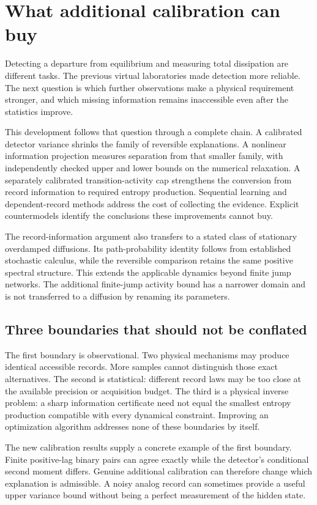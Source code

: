 \chapter{What additional calibration can buy}
\label{ci:entry}

Detecting a departure from equilibrium and measuring total dissipation are
different tasks. The previous virtual laboratories made detection more
reliable. The next question is which further observations make a physical
requirement stronger, and which missing information remains inaccessible even
after the statistics improve.

This development follows that question through a complete chain. A calibrated
detector variance shrinks the family of reversible explanations. A nonlinear
information projection measures separation from that smaller family, with
independently checked upper and lower bounds on the numerical relaxation.
A separately calibrated transition-activity cap strengthens the conversion
from record information to required entropy production. Sequential learning
and dependent-record methods address the cost of collecting the evidence.
Explicit countermodels identify the conclusions these improvements cannot buy.

The record-information argument also transfers to a stated class of stationary
overdamped diffusions. Its path-probability identity follows from established
stochastic calculus, while the reversible comparison retains the same positive
spectral structure. This extends the applicable dynamics beyond finite jump
networks. The additional finite-jump activity bound has a narrower domain and
is not transferred to a diffusion by renaming its parameters.

\section{Three boundaries that should not be conflated}
The first boundary is observational. Two physical mechanisms may produce
identical accessible records. More samples cannot distinguish those exact
alternatives. The second is statistical: different record laws may be too
close at the available precision or acquisition budget. The third is a
physical inverse problem: a sharp information certificate need not equal the
smallest entropy production compatible with every dynamical constraint.
Improving an optimization algorithm addresses none of these boundaries by
itself.

The new calibration results supply a concrete example of the first boundary.
Finite positive-lag binary pairs can agree exactly while the detector's
conditional second moment differs. Genuine additional calibration can
therefore change which explanation is admissible. A noisy analog record can
sometimes provide a useful upper variance bound without being a perfect
measurement of the hidden state.

